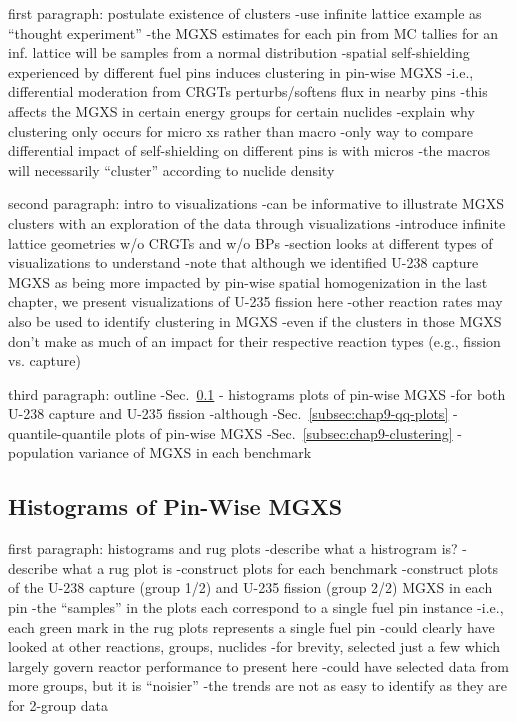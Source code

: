 first paragraph: postulate existence of clusters
-use infinite lattice example as ``thought experiment''
  -the \ac{MGXS} estimates for each pin from \ac{MC} tallies for an inf. lattice will be samples from a normal distribution
-spatial self-shielding experienced by different fuel pins induces clustering in pin-wise MGXS
  -i.e., differential moderation from \acp{CRGT} perturbs/softens flux in nearby pins
  -this affects the \ac{MGXS} in certain energy groups for certain nuclides
-explain why clustering only occurs for micro xs rather than macro
  -only way to compare differential impact of self-shielding on different pins is with micros
  -the macros will necessarily ``cluster'' according to nuclide density
  
second paragraph: intro to visualizations
-can be informative to illustrate \ac{MGXS} clusters with an exploration of the data through visualizations
-introduce infinite lattice geometries w/o \acp{CRGT} and w/o \acp{BP}
-section looks at different types of visualizations to understand
-note that although we identified U-238 capture \ac{MGXS} as being more impacted by pin-wise spatial homogenization in the last chapter, we present visualizations of U-235 fission here
  -other reaction rates may also be used to identify clustering in \ac{MGXS}
  -even if the clusters in those \ac{MGXS} don't make as much of an impact for their respective reaction types (e.g., fission vs. capture)

third paragraph: outline
-Sec.~\ref{subsec:chap9-histograms} - histograms plots of pin-wise \ac{MGXS}
  -for both U-238 capture and U-235 fission
  -although 
-Sec.~\ref{subsec:chap9-qq-plots} - quantile-quantile plots of pin-wise \ac{MGXS}
-Sec.~\ref{subsec:chap9-clustering} - population variance of \ac{MGXS} in each benchmark

\subsection{Histograms of Pin-Wise MGXS}
\label{subsec:chap9-histograms}

first paragraph: histograms and rug plots
-describe what a histrogram is?
-describe what a rug plot is
-construct plots for each benchmark
-construct plots of the U-238 capture (group 1/2) and U-235 fission (group 2/2) \ac{MGXS} in each pin
  -the ``samples'' in the plots each correspond to a single fuel pin instance
    -i.e., each green mark in the rug plots represents a single fuel pin
-could clearly have looked at other reactions, groups, nuclides
  -for brevity, selected just a few which largely govern reactor performance to present here
  -could have selected data from more groups, but it is ``noisier''
    -the trends are not as easy to identify as they are for 2-group data


